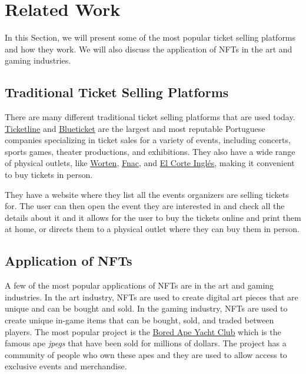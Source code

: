 \section{Related Work}
\label{sec:related_work}

In this Section, we will present some of the most popular ticket selling
platforms and how they work. We will also discuss the application of NFTs in
the art and gaming industries.

\subsection{Traditional Ticket Selling Platforms}
\label{subsec:traditional_ticket_selling_platforms}

There are many different traditional ticket selling platforms that are used
today. \href{https://ticketline.sapo.pt/}{Ticketline} and
\href{https://blueticket.meo.pt/}{Blueticket} are the largest and most
reputable Portuguese companies specializing in ticket sales for a variety of
events, including concerts, sports games, theater productions, and exhibitions.
They also have a wide range of physical outlets, like
\href{https://www.worten.pt/}{Worten}, \href{https://www.fnac.pt/}{Fnac}, and
\href{https://www.elcorteingles.pt/}{El Corte Inglés}, making it convenient to
buy tickets in person.

They have a website where they list all the events organizers are selling
tickets for. The user can then open the event they are interested in and check
all the details about it and it allows for the user to buy the tickets online
and print them at home, or directs them to a physical outlet where they can buy
them in person.



\subsection{Application of NFTs}
\label{subsec:application_of_nfts}

A few of the most popular applications of NFTs are in the art and gaming
industries. In the art industry, NFTs are used to create digital art pieces
that are unique and can be bought and sold. In the gaming industry, NFTs are
used to create unique in-game items that can be bought, sold, and traded
between players. The most popular project is the
\href{https://www.boredapeyachtclub.com/}{Bored Ape Yacht Club} which is the
famous ape \textit{jpegs} that have been sold for millions of dollars. The
project has a community of people who own these apes and they are used to allow
access to exclusive events and merchandise.